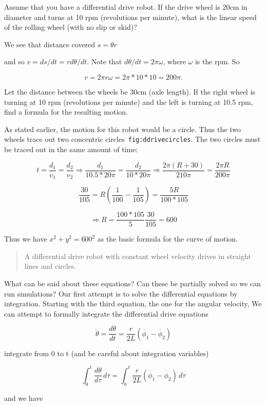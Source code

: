 Assume that you have a differential drive robot. If the drive wheel is
20cm in diameter and turns at 10 rpm (revolutions per minute), what is
the linear speed of the rolling wheel (with no slip or skid)?

We see that distance covered \(s = \theta r\)

and so \(v = ds/dt = r d\theta /dt\). Note that
\(d\theta/dt = 2\pi \omega\), where \(\omega\) is the rpm. So

\[v = 2\pi r \omega = 2\pi *10*10=200\pi.\]

Let the distance between the wheels be 30cm (axle length). If the right
wheel is turning at 10 rpm (revolutions per minute) and the left is
turning at 10.5 rpm, find a formula for the resulting motion.

As stated earlier, the motion for this robot would be a circle. Thus the
two wheels trace out two concentric circles~\texttt{fig:ddrivecircles}.
The two circles must be traced out in the same amount of time:

\[t = \frac{d_1}{v_1} = \frac{d_2}{v_2} \Rightarrow \frac{d_1}{10.5*20\pi} =
\frac{d_2}{10*20\pi}
\Rightarrow \frac{2\pi(R+30)}{210\pi} = \frac{2\pi R}{200\pi}\]

\[\frac{30}{105} = R\left( \frac{1}{100} - \frac{1}{105}\right) =
\frac{5R}{100*105}\]

\[\Rightarrow R = \frac{100*105}{5} \frac{30}{105} = 600\]

Thus we have \(x^2 + y^2 = 600^2\) as the basic formula for the curve of
motion.

\begin{quote}
A differential drive robot with constant wheel velocity drives in
straight lines and circles.
\end{quote}

What can be said about these equations? Can these be partially solved so
we can run simulations? Our first attempt is to solve the differential
equations by integration. Starting with the third equation, the one for
the angular velocity, We can attempt to formally integrate the
differential drive equations

\[\dot{\theta} =\frac{d\theta}{dt} = \frac{r}{2L} (\dot{\phi_1}-\dot{\phi_2})\]

integrate from 0 to t (and be careful about integration variables)

\[\int_0^t\frac{d\theta}{d\tau}\, d\tau = \int_0^t\frac{r}{2L} (\dot{\phi_1}-\dot{\phi_2})\, d\tau\]

and we have

